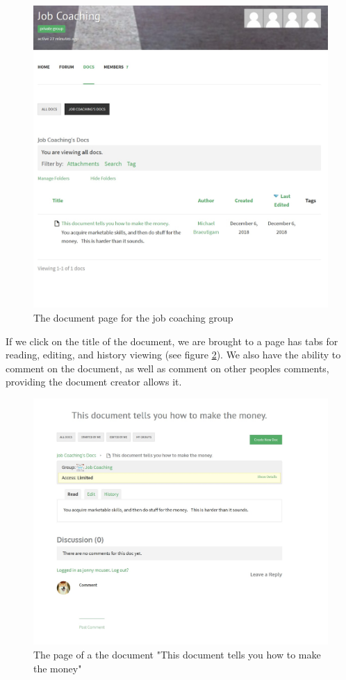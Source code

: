\documentclass[10pt]{article}
\begin{document}
\begin{figure}[H]
    \centering
    \includegraphics[scale=0.4]{images/groupsdocs.jpg}
    \caption{The document page for the job coaching group}
    \label{groupsdocs}
\end{figure}

\begin{flushleft}
If we click on the title of the document, we are brought to a page has tabs for reading, editing, and history viewing (see figure \ref{docpage}).  We also have the ability to comment on the document, as well as comment on other peoples comments, providing the document creator allows it. 
\end{flushleft}

\begin{figure}[H]
    \centering
    \includegraphics[scale=0.5]{images/docpage.jpg}
    \caption{The page of a the document "This document tells you how to make the money"}
    \label{docpage}
\end{figure}
\end{document}
